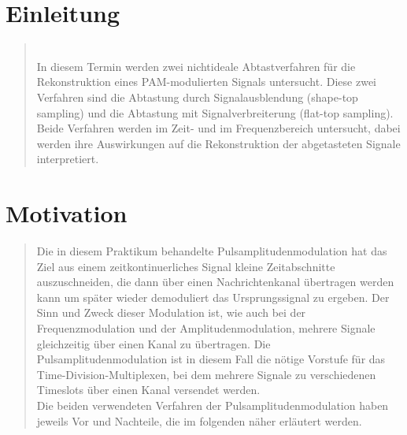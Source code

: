 \section{Einleitung}
\begin{quote}
	\\
	In diesem Termin werden zwei nichtideale Abtastverfahren für die
	Rekonstruktion eines PAM-modulierten Signals untersucht. Diese zwei Verfahren
	sind die Abtastung durch Signalausblendung (shape-top sampling) und die
	Abtastung mit Signalverbreiterung (flat-top sampling). Beide Verfahren werden
	im Zeit- und im Frequenzbereich untersucht, dabei werden ihre Auswirkungen auf
	die Rekonstruktion der abgetasteten Signale interpretiert.
\end{quote}%

\section{Motivation}
\begin{quote}
	Die in diesem Praktikum behandelte Pulsamplitudenmodulation hat das Ziel aus
	einem zeitkontinuerliches Signal kleine Zeitabschnitte auszuschneiden, die dann über einen Nachrichtenkanal übertragen
	werden kann um später wieder demoduliert das Ursprungssignal zu ergeben. Der
	Sinn und Zweck dieser Modulation ist, wie auch bei der Frequenzmodulation und der Amplitudenmodulation, 
	mehrere Signale gleichzeitig über einen Kanal zu übertragen. Die Pulsamplitudenmodulation ist in
	diesem Fall die nötige Vorstufe für das Time-Division-Multiplexen, bei dem mehrere Signale zu verschiedenen Timeslots
	über einen Kanal versendet werden.\\
	Die beiden verwendeten Verfahren der Pulsamplitudenmodulation haben jeweils Vor und Nachteile, die im folgenden näher
	erläutert werden.
\end{quote} %



